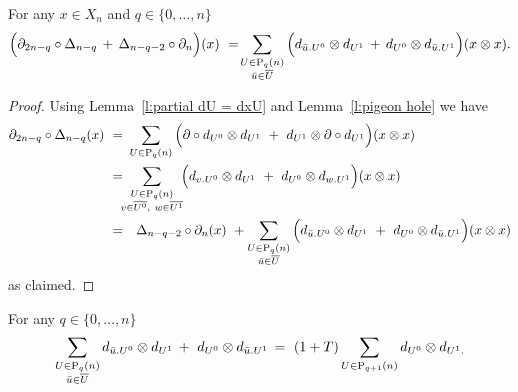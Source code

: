 \begin{lemma} \label{l:boundary of Delta}
	For any $x \in X_n$ and $q \in \{0, \dots, n\}$
	\begin{equation} \label{e:boundary of Delta}
	\Big( \partial_{2n-q} \circ \Delta_{n - q} \, +\, \Delta_{n-q-2} \circ \partial_n \Big) (x) \ = \! 
	\sum_{\substack{U \in \mathrm{P}_{q}(n) \\ {\bar{u}} \in \overline{U}}} \Big( d_{{\bar{u}}.U^0} \otimes d_{U^1} \, + \, d_{U^0} \otimes d_{{\bar{u}}.U^1} \Big) (x \otimes x).
	\end{equation}
\end{lemma}

\begin{proof}
	Using Lemma~\ref{l:partial dU = dxU} and Lemma~\ref{l:pigeon hole} we have
	\begin{equation*}
	\begin{split}
	\partial_{2n-q} \circ \Delta_{n - q} (x) \ = & \
	\sum_{U \in \P_q(n)} \Big( \partial \circ d_{U^0} \otimes d_{U^1}\ +\ d_{U^1} \otimes \partial \circ d_{U^1} \Big) (x \otimes x) \\ = & \!\!
	\sum_{\substack{U \in \P_q(n) \\ v \in \overline{U^0},\ w \in \overline{U^1} } }\!\! \Big( d_{v.U^0} \otimes d_{U^1}\ +\ d_{U^0} \otimes d_{w.U^1}\Big) (x \otimes x) \\ = &
	\quad \Delta_{n-q-2} \circ \partial_n (x) \ + 
	\sum_{\substack{U\in\P_{q}(n) \\ \bu \in \overline{U}}} \Big( d_{\bu.U^0} \otimes d_{U^1}\ +\ d_{U^0} \otimes d_{\bu.U^1}\Big) (x \otimes x)
	\end{split}
	\end{equation*}
	as claimed.
\end{proof}

\begin{lemma} \label{l:big lemma}  
	For any $q \in \{0, \dots, n\}$
	\begin{equation} \label{e:big lemma}
	\sum_{\substack{U \in \mathrm{P}_{q}(n) \\ {\bar{u}} \in \overline{U}}} d_{{\bar{u}}.U^0} \otimes d_{U^1}\, +\ d_{U^0} \otimes d_{{\bar{u}}.U^1}\, = \
	(1+T) \sum_{U \in \mathrm{P}_{q+1}(n)} d_{U^0} \otimes d_{U^1.}
	\end{equation}
\end{lemma}

